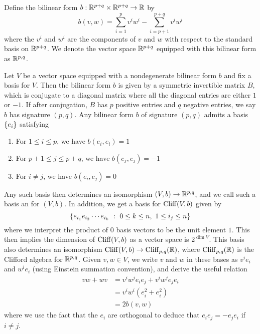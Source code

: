%
\begin{defn}
Define the bilinear form $b : \mathbb{R}^{p+q} \times \mathbb{R}^{p+q} \to \mathbb{R}$ by
\[
b(v,w) = \sum_{i = 1}^{p} v^iw^i - \sum_{i = p+1}^{p+q} v^iw^i
\]
where the $v^i$ and $w^i$ are the components of $v$ and $w$ with respect to
the standard basis on $\mathbb{R}^{p+q}$. We denote the vector space $\mathbb{R}^{p+q}$
equipped with this bilinear form as $\mathbb{R}^{p,q}$.
\end{defn}
%
Let $V$ be a vector space equipped with a nondegenerate bilinear form $b$ and
fix a basis for $V$. Then the bilinear form $b$ is given by a symmetric
invertible matrix $B$, which is conjugate to a diagonal matrix where all
the diagonal entries are either $1$ or $-1$. If after conjugation, $B$ has
$p$ positive entries and $q$ negative entries, we say $b$ has signature $(p,q)$.
Any bilinear form $b$ of signature $(p,q)$ admits a basis $\left\lbrace e_i \right\rbrace$ satisfying
%
\begin{enumerate}
  \item For $1 \leq i \leq p$, we have $b(e_i,e_i) = 1$
  \item For $p+1 \leq j \leq p+q$, we have $b(e_j,e_j) = -1$
  \item For $i \neq j$, we have $b(e_i,e_j) = 0$
\end{enumerate}
%
Any such basis then determines an isomorphism $(V,b) \to \mathbb{R}^{p,q}$, and we
call such a basis an  for $(V,b)$.
In addition, we get a basis for $\operatorname{Cliff}(V,b)$ given by
\[
\left\lbrace e_{i_1}e_{i_2}\cdots e_{i_k}~:~ 0 \leq k \leq n, ~ 1 \leq i_j \leq n \right\rbrace
\]
where we interpret the product of $0$ basis vectors to be the unit element $1$.
This then implies the dimension of $\operatorname{Cliff}(V,b)$ as a vector space is
$2^{\dim V}$. This basis also determines an isomorphism
$\operatorname{Cliff}(V,b) \to \operatorname{Cliff}_{p,q}(\mathbb{R})$, where $\operatorname{Cliff}_{p,q}(\mathbb{R})$ is the Clifford
algebra for $\mathbb{R}^{p,q}$. Given $v,w \in V$, we write $v$ and $w$ in these
bases as $v^ie_i$ and $w^ie_i$ (using Einstein summation convention),
and derive the useful relation
%
\begin{align*}
vw + wv &= v^iw^je_ie_j + v^iw^je_je_i \\
&= v^iw^i(e_i^2 + e_i^2) \\
&= 2b(v,w)
\end{align*}
where we use the fact that the $e_i$ are orthogonal to deduce that
$e_ie_j = -e_je_i$ if $i \neq j$.
%

